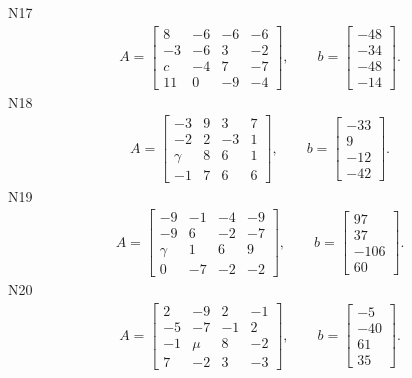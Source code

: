 \documentclass[11pt]{report}
\begin{document}
N17
\begin{align*}
 A = \left[\begin{matrix}8 & -6 & -6 & -6\\-3 & -6 & 3 & -2\\c & -4 & 7 & -7\\11 & 0 & -9 & -4\end{matrix}\right],
\qquad b = \left[\begin{matrix}-48\\-34\\-48\\-14\end{matrix}\right]. 
 \end{align*}
N18
\begin{align*}
 A = \left[\begin{matrix}-3 & 9 & 3 & 7\\-2 & 2 & -3 & 1\\\gamma & 8 & 6 & 1\\-1 & 7 & 6 & 6\end{matrix}\right],
\qquad b = \left[\begin{matrix}-33\\9\\-12\\-42\end{matrix}\right]. 
 \end{align*}
N19
\begin{align*}
 A = \left[\begin{matrix}-9 & -1 & -4 & -9\\-9 & 6 & -2 & -7\\\gamma & 1 & 6 & 9\\0 & -7 & -2 & -2\end{matrix}\right],
\qquad b = \left[\begin{matrix}97\\37\\-106\\60\end{matrix}\right]. 
 \end{align*}
N20
\begin{align*}
 A = \left[\begin{matrix}2 & -9 & 2 & -1\\-5 & -7 & -1 & 2\\-1 & \mu & 8 & -2\\7 & -2 & 3 & -3\end{matrix}\right],
\qquad b = \left[\begin{matrix}-5\\-40\\61\\35\end{matrix}\right]. 
 \end{align*}
\end{document}
